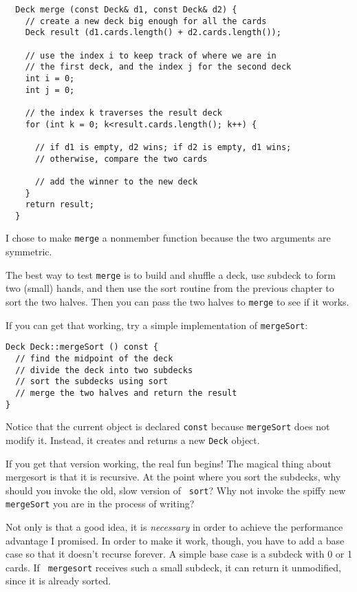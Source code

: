 \begin{verbatim}
  Deck merge (const Deck& d1, const Deck& d2) {
    // create a new deck big enough for all the cards
    Deck result (d1.cards.length() + d2.cards.length());

    // use the index i to keep track of where we are in
    // the first deck, and the index j for the second deck
    int i = 0;
    int j = 0;
		
    // the index k traverses the result deck
    for (int k = 0; k<result.cards.length(); k++) {
			
      // if d1 is empty, d2 wins; if d2 is empty, d1 wins;
      // otherwise, compare the two cards
			
      // add the winner to the new deck
    }
    return result;
  }
\end{verbatim}
%
I chose to make {\tt merge} a nonmember function because
the two arguments are symmetric.

The best way to test {\tt merge} is to build and shuffle a deck,
use subdeck to form two (small) hands, and then use the sort
routine from the previous chapter to sort the two halves.  Then
you can pass the two halves to {\tt merge} to see if it works.


If you can get that working, try a simple implementation of
{\tt mergeSort}:

\begin{verbatim}
Deck Deck::mergeSort () const {
  // find the midpoint of the deck
  // divide the deck into two subdecks
  // sort the subdecks using sort
  // merge the two halves and return the result
}
\end{verbatim}
%
Notice that the current object is declared {\tt const} because
{\tt mergeSort} does not modify it.  Instead, it creates and
returns a new {\tt Deck} object.

If you get that version working, the real fun begins!  The magical thing
about mergesort is that it is recursive.  At the point where you sort
the subdecks, why should you invoke the old, slow version of {\tt
sort}?  Why not invoke the spiffy new {\tt mergeSort} you are in the
process of writing?


Not only is that a good idea, it is {\em necessary} in order to
achieve the performance advantage I promised.  In order to make it
work, though, you have to add a base case so that it doesn't recurse
forever.  A simple base case is a subdeck with 0 or 1 cards.  If {\tt
mergesort} receives such a small subdeck, it can return it
unmodified, since it is already sorted.

